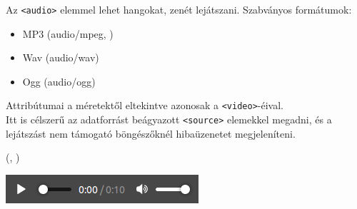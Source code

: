 \begin{frame}
  Az \texttt{<audio>} elemmel lehet hangokat, zenét lejátszani. 
  Szabványos formátumok:
  \begin{itemize}
    \item MP3 (audio/mpeg, )
    \item Wav (audio/wav)
    \item Ogg (audio/ogg)
  \end{itemize}
  Attribútumai a méretektől eltekintve azonosak a 
  \texttt{<video>}-éival. \\
  Itt is célszerű az adatforrást beágyazott \texttt{<source>} 
  elemekkel megadni, és a lejátszást nem támogató böngészőknél 
  hibaüzenetet megjeleníteni.
\end{frame}

\begin{frame}
  \begin{exampleblock}{
    (, 
     )}
    \small
    
  \end{exampleblock}
  \begin{center}
    \includegraphics[scale=.5]{audio1.png}\\
  \end{center}
\end{frame}
